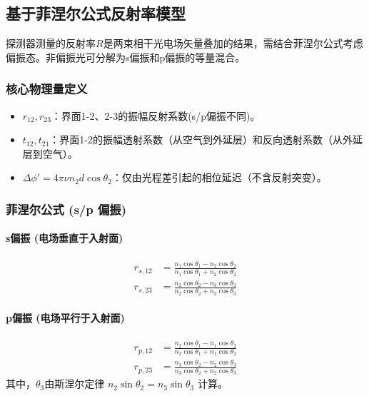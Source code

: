 \documentclass[withoutpreface,bwprint]{cumcmthesis} %
\begin{document}
\subsection{基于菲涅尔公式\cite{菲涅尔公式}反射率模型}

探测器测量的反射率$R$是两束相干光电场矢量叠加的结果，需结合菲涅尔公式\cite{菲涅尔公式}考虑偏振态。非偏振光可分解为s偏振和p偏振的等量混合。

\subsubsection{核心物理量定义}
\begin{itemize}
    \item $r_{12}, r_{23}$：界面1-2、2-3的振幅反射系数(s/p偏振不同)。
    \item $t_{12}, t_{21}$：界面1-2的振幅透射系数（从空气到外延层）和反向透射系数（从外延层到空气）。
    \item $\Delta\phi' = 4\pi\nu n_2 d \cos\theta_2$：仅由光程差引起的相位延迟（不含反射突变）。
\end{itemize}

\subsubsection{菲涅尔公式\cite{菲涅尔公式} (s/p 偏振)}
\paragraph{s偏振 (电场垂直于入射面)}
\begin{align}
r_{s,12} &= \frac{n_1 \cos\theta_1 - n_2 \cos\theta_2}{n_1 \cos\theta_1 + n_2 \cos\theta_2} \\
r_{s,23} &= \frac{n_2 \cos\theta_2 - n_3 \cos\theta_3}{n_2 \cos\theta_2 + n_3 \cos\theta_3}
\end{align}

\paragraph{p偏振 (电场平行于入射面)}
\begin{align}
r_{p,12} &= \frac{n_2 \cos\theta_1 - n_1 \cos\theta_2}{n_2 \cos\theta_1 + n_1 \cos\theta_2} \\
r_{p,23} &= \frac{n_3 \cos\theta_2 - n_2 \cos\theta_3}{n_3 \cos\theta_2 + n_2 \cos\theta_3}
\end{align}
其中，$\theta_3$由斯涅尔定律 $n_2\sin\theta_2 = n_3\sin\theta_3$ 计算。
\end{document}

